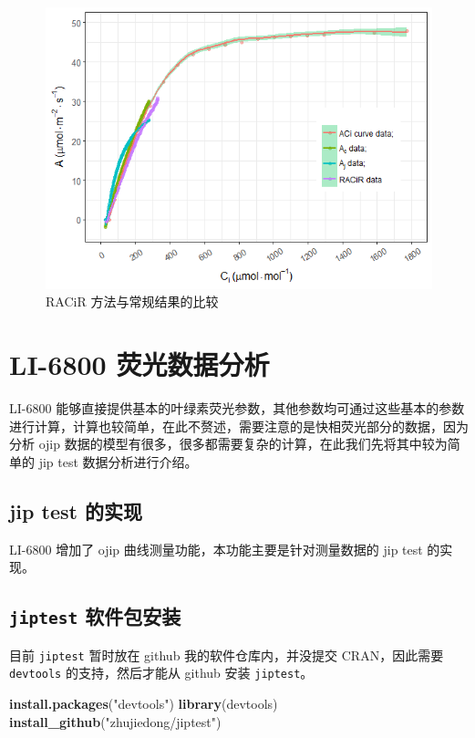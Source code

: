 \documentclass[]{krantz}
\makeatletter
\newenvironment{Shaded}{\begin{snugshade}}{\end{snugshade}}
\newcommand{\KeywordTok}[1]{\textcolor[rgb]{0.13,0.29,0.53}{\textbf{#1}}}
\newcommand{\StringTok}[1]{\textcolor[rgb]{0.31,0.60,0.02}{#1}}
\newcommand{\NormalTok}[1]{#1}
\newenvironment{kframe}{%
\medskip{}
\setlength{\fboxsep}{.8em}
 \def\at@end@of@kframe{}%
 \ifinner\ifhmode%
  \def\at@end@of@kframe{\end{minipage}}%
  \begin{minipage}{\columnwidth}%
 \fi\fi%
 \def\FrameCommand##1{\hskip\@totalleftmargin \hskip-\fboxsep
 \colorbox{shadecolor}{##1}\hskip-\fboxsep
     \hskip-\linewidth \hskip-\@totalleftmargin \hskip\columnwidth}%
 \MakeFramed {\advance\hsize-\width
   \@totalleftmargin\z@ \linewidth\hsize
   \@setminipage}}%
 {\par\unskip\endMakeFramed%
 \at@end@of@kframe}
\renewenvironment{Shaded}{\begin{kframe}}{\end{kframe}}
\theoremstyle{definition}
\theoremstyle{definition}
\theoremstyle{definition}
\theoremstyle{remark}
\makeatother
\begin{document}
\begin{figure}
\includegraphics[width=1\linewidth]{images/racir} \caption{RACiR 方法与常规结果的比较}\label{fig:racir}
\end{figure}

\section{LI-6800 荧光数据分析}\label{li-6800-}

LI-6800
能够直接提供基本的叶绿素荧光参数，其他参数均可通过这些基本的参数进行计算，计算也较简单，在此不赘述，需要注意的是快相荧光部分的数据，因为分析
ojip 数据的模型有很多，很多都需要复杂的计算，在此我们先将其中较为简单的
jip test 数据分析进行介绍。

\subsection{jip test 的实现}\label{jip-test-}

LI-6800 增加了 ojip 曲线测量功能，本功能主要是针对测量数据的 jip test
的实现。

\subsection{\texorpdfstring{\texttt{jiptest}
软件包安装}{jiptest 软件包安装}}\label{jiptest-}

目前 \texttt{jiptest} 暂时放在 github 我的软件仓库内，并没提交
CRAN，因此需要 \texttt{devtools} 的支持，然后才能从 github 安装
\texttt{jiptest}。

\begin{Shaded}
\begin{Highlighting}[]
\KeywordTok{install.packages}\NormalTok{(}\StringTok{"devtools"}\NormalTok{)}
\KeywordTok{library}\NormalTok{(devtools)}
\KeywordTok{install_github}\NormalTok{(}\StringTok{"zhujiedong/jiptest"}\NormalTok{)}
\end{Highlighting}
\end{Shaded}
\end{document}

